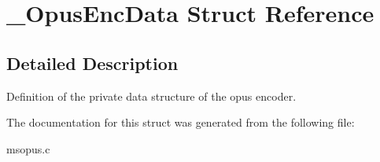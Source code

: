\section{\_\-OpusEncData Struct Reference}
\label{struct__OpusEncData}


\subsection{Detailed Description}
Definition of the private data structure of the opus encoder. 

The documentation for this struct was generated from the following file:\begin{DoxyCompactItemize}
\item 
msopus.c\end{DoxyCompactItemize}
